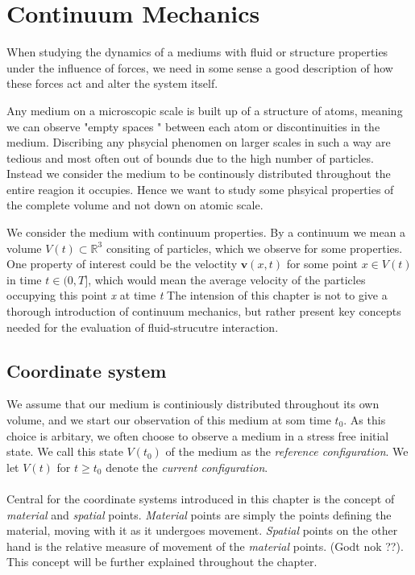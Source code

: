 \chapter{Continuum Mechanics}
When studying the dynamics of a mediums with fluid or structure properties under the influence of forces, we need in some sense a good description of how these forces act and alter the system itself.

Any medium on a microscopic scale is built up of a structure of atoms, meaning we can observe "empty spaces " between each atom or discontinuities in the medium. Discribing any phsycial phenomen on larger scales in such a way are tedious and most often out of bounds due to the high number of particles. Instead we consider the medium to be continously distributed throughout the entire reagion it occupies. Hence we want to study some phsyical properties of the complete volume and not down on atomic scale. 

We consider the medium with continuum properties. By a continuum we mean a volume $V(t) \subset \mathbb{R}^3$ 
consiting of particles, which we observe for some properties. One property of interest could be the veloctity $\textbf{v}(x,t)$ for some point $x \in V(t)$ in time $t \in (0, T]$, which would mean the average velocity of the particles occupying this point \textit{x} at time \textit{t}  
The intension of this chapter is not to give a 
thorough introduction of continuum mechanics, but rather present key concepts needed for the evaluation of fluid-strucutre interaction.  

\section{Coordinate system}
We assume that our medium is continiously distributed throughout its own volume, and we start our observation of this medium
at som time $t_0$. As this choice is arbitary, we often choose to observe a medium in a stress free initial state. We call this state $V(t_0)$ of the medium as the \textit{reference configuration}. We let $V(t)$ for 
$t \geq t_0$ denote the \textit{current configuration}. \\ \\
Central for the coordinate systems introduced in this chapter is the concept of \textit{material} and \textit{spatial} points. \textit{Material} points are simply the points defining the material, moving with it as it undergoes movement. \textit{Spatial} points on the other hand is the relative measure of movement of the \textit{material} points. (Godt nok ??). This concept will be further explained throughout the chapter.

